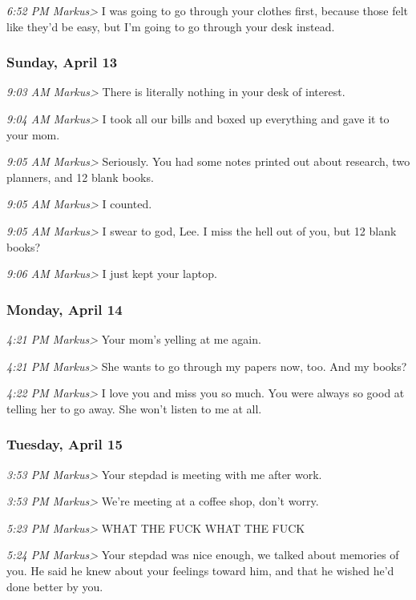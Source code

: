 {\emph{6:52 PM Markus\textgreater{}} I was going to go through your
clothes first, because those felt like they'd be easy, but I'm going to
go through your desk instead.

\subsubsection*{Sunday, April 13}\label{sunday-april-13}

\emph{9:03 AM Markus\textgreater{}} There is literally nothing in your
desk of interest.

\emph{9:04 AM Markus\textgreater{}} I took all our bills and boxed up
everything and gave it to your mom.

\emph{9:05 AM Markus\textgreater{}} Seriously. You had some notes
printed out about research, two planners, and 12 blank books.

\emph{9:05 AM Markus\textgreater{}} I counted.

\emph{9:05 AM Markus\textgreater{}} I swear to god, Lee. I miss the hell
out of you, but 12 blank books?

\emph{9:06 AM Markus\textgreater{}} I just kept your laptop.

\subsubsection*{Monday, April 14}\label{monday-april-14}

\emph{4:21 PM Markus\textgreater{}} Your mom's yelling at me again.

\emph{4:21 PM Markus\textgreater{}} She wants to go through my papers
now, too. And my books?

\emph{4:22 PM Markus\textgreater{}} I love you and miss you so much. You
were always so good at telling her to go away. She won't listen to me at
all.

\subsubsection*{Tuesday, April 15}\label{tuesday-april-15}

\emph{3:53 PM Markus\textgreater{}} Your stepdad is meeting with me
after work.

\emph{3:53 PM Markus\textgreater{}} We're meeting at a coffee shop,
don't worry.

\emph{5:23 PM Markus\textgreater{}} WHAT THE FUCK WHAT THE FUCK

\emph{5:24 PM Markus\textgreater{}} Your stepdad was nice enough, we
talked about memories of you. He said he knew about your feelings toward
him, and that he wished he'd done better by you.

}
